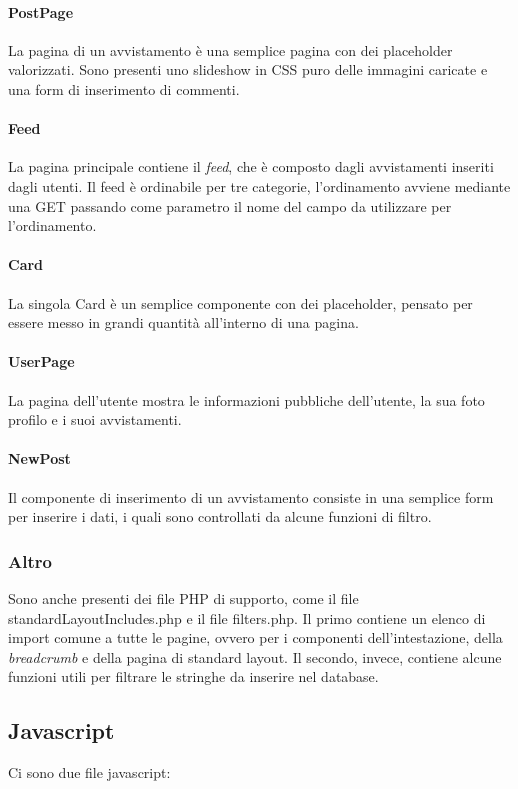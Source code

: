 \documentclass[12pt, a4paper]{article}
\begin{document}
    \paragraph{PostPage}
    La pagina di un avvistamento è una semplice pagina con dei placeholder valorizzati. Sono presenti uno slideshow in CSS puro delle immagini caricate e una form di inserimento di commenti.

    \paragraph{Feed}
    La pagina principale contiene il \textit{feed}, che è composto dagli avvistamenti inseriti dagli utenti. Il feed è ordinabile per tre categorie, l'ordinamento avviene mediante una GET passando come parametro il nome del campo da utilizzare per l'ordinamento.

    \paragraph{Card}
    La singola Card è un semplice componente con dei placeholder, pensato per essere messo in grandi quantità all'interno di una pagina.

    \paragraph{UserPage}
    La pagina dell'utente mostra le informazioni pubbliche dell'utente, la sua foto profilo e i suoi avvistamenti.

    \paragraph{NewPost}
    Il componente di inserimento di un avvistamento consiste in una semplice form per inserire i dati, i quali sono controllati da alcune funzioni di filtro.

    \subsubsection{Altro}
    Sono anche presenti dei file PHP di supporto, come il file standardLayoutIncludes.php e il file filters.php. Il primo contiene un elenco di import comune a tutte le pagine, ovvero per i componenti dell'intestazione, della \textit{breadcrumb} e della pagina di standard layout. Il secondo, invece, contiene alcune funzioni utili per filtrare le stringhe da inserire nel database.

    \subsection{Javascript}
    Ci sono due file javascript:
\end{document}
